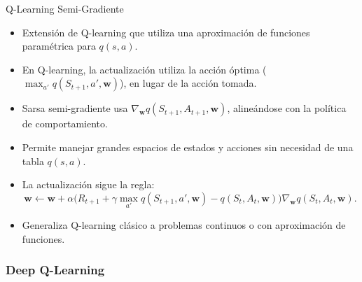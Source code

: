 \documentclass[10pt, envcountsect, handout, aspectratio=1610, hyperref={hypertexnames=true}]{beamer}
\begin{document}
\begin{frame}{Q-Learning Semi-Gradiente}
\begin{itemize}
		 
		
		\item Extensión de Q-learning que utiliza una aproximación de funciones paramétrica para \(q(s, a)\).
		
		
		
		\item En Q-learning, la actualización utiliza la acción óptima (\(\max_{a'} q(S_{t+1}, a', \mathbf{w})\)), en lugar de la acción tomada.
		
		\item Sarsa semi-gradiente usa \(\nabla_{\mathbf{w}} q(S_{t+1}, A_{t+1}, \mathbf{w})\), alineándose con la política de comportamiento.
		
		
		\item Permite manejar grandes espacios de estados y acciones sin necesidad de una tabla \(q(s, a)\).
		\item La actualización sigue la regla:
		\[
		\mathbf{w} \gets \mathbf{w} + \alpha \big(R_{t+1} + \gamma \max_{a'} q(S_{t+1}, a', \mathbf{w}) - q(S_t, A_t, \mathbf{w})\big) \nabla_{\mathbf{w}} q(S_t, A_t, \mathbf{w}).
		\]
		\item Generaliza Q-learning clásico a problemas continuos o con aproximación de funciones.
	\end{itemize}

\end{frame}


\subsubsection{Deep Q-Learning}
\end{document}
